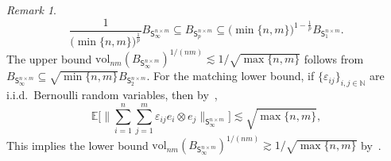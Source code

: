 \documentclass[11pt,reqno]{amsart}
\newcommand{\e}{\varepsilon}
\theoremstyle{remark}
\newtheorem{remark}[theorem]{Remark}
\newcommand{\sfS}{\mathsf{S}}
\renewcommand{\subset}{\subseteq}
\newcommand{\E}{\mathbb{ E}}
\newcommand{\N}{\mathbb N}
\newcommand{\vol}{\mathrm{vol}}
\renewcommand{\1}{\mathbf 1}
\begin{document}
\begin{remark}
$$
\frac{1}{\big(\min\{n,m\}\big)^{\frac{1}{p}}}B_{\sfS^{n\times m}_\infty}\subset B_{\sfS^{n\times m}_p}\subset \big(\min\{n,m\}\big)^{1-\frac{1}{p}} B_{\sfS^{n\times m}_1}.
$$
The upper bound $\vol_{nm}(B_{\sfS^{n\times m}_\infty})^{1/(nm)}\lesssim 1/\sqrt{\max\{n,m\}}$ follows from $B_{\sfS^{n\times m}_\infty}\subset \sqrt{\min\{n,m\}}B_{\sfS^{n\times m}_2}$. For the matching lower bound, if $\{\e_{ij}\}_{i,j\in \N}$ are i.i.d.~Bernoulli random variables, then by~\cite[Theorem~1]{BGN75},
$$
\E \bigg[\Big\|\sum_{i=1}^n\sum_{j=1}^m\e_{ij} e_{i}\otimes e_j\Big\|_{\sfS^{n\times m}_\infty}\bigg]\lesssim \sqrt{\max\{n,m\}},
$$
This implies the lower bound $\vol_{nm}(B_{\sfS^{n\times m}_\infty})^{1/(nm)}\gtrsim 1/\sqrt{\max\{n,m\}}$  by~\cite[Lemma~1.5]{Sch82}.
\end{remark}
\end{document}
